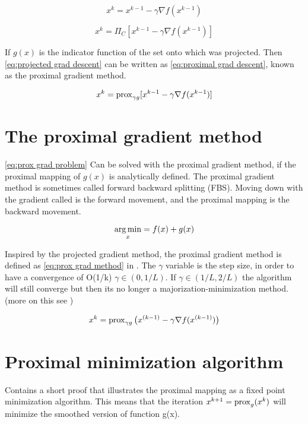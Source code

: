 		\begin{equation}
			x^k = x^{k-1} - \gamma \nabla f(x^{k-1})
			\label{eq:grad descent}
		\end{equation}
		
		\begin{equation}
			x^k = \Pi_C[ x^{k-1} - \gamma \nabla f(x^{k-1})]
			\label{eq:projected grad descent}
		\end{equation}
		
		If $g(x)$ is the indicator function of the set onto which was projected. Then  \eqref{eq:projected grad descent} can be written as \eqref{eq:proximal grad descent}, known as the proximal gradient method.
		
		\begin{equation}
				x^k = \operatorname{prox}_{\gamma g}[ x^{k-1} - \gamma \nabla f(x^{k-1})]
			\label{eq:proximal grad descent}
		\end{equation}
	
	\section{The proximal gradient method}
		\eqref{eq:prox grad problem} Can be solved with the proximal gradient method, if the proximal mapping of $g(x)$ is analytically defined.  The proximal gradient method is sometimes called forward backward splitting (FBS). Moving down with the gradient called is the forward movement, and the proximal mapping is the backward movement.
		
			\begin{equation}
			\underset{x}{\operatorname*{arg\,min}} = f(x) + g(x)
			\label{eq:prox grad problem}
			\end{equation}
		
		Inspired by the projected gradient method, the proximal gradient method is defined as \eqref{eq:prox grad method} in \cite{NealParikh}. The $\gamma$ variable is the step size, in order to have a convergence of O(1/k) $\gamma \in(0,1/L)$. If $\gamma \in (1/L,2/L)$ the algorithm will still converge but then its no longer a majorization-minimization method. (more on this see \cite{NealParikh})
		
		\begin{equation}
			x^k = \operatorname{prox}_{\gamma g}\big( x^{(k-1)}- \gamma \nabla f(x^{(k-1)})\big)
			\label{eq:prox grad method}
		\end{equation}	
	
	\section{Proximal minimization algorithm}
		 \cite{QianYang} Contains a short proof that illustrates the proximal mapping as a fixed point minimization algorithm. This means that the iteration $x^{k+1}=\operatorname{prox}_g(x^k)$ will minimize the smoothed version of function g(x). 
		 
